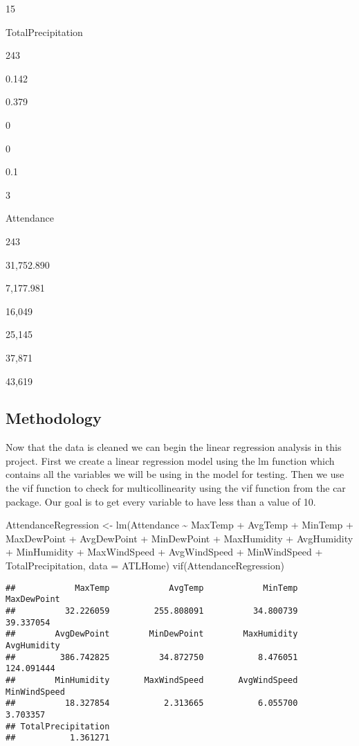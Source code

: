 \documentclass[
]{article}
\newenvironment{Shaded}{\begin{snugshade}}{\end{snugshade}}
\newcommand{\AttributeTok}[1]{\textcolor[rgb]{0.77,0.63,0.00}{#1}}
\newcommand{\FunctionTok}[1]{\textcolor[rgb]{0.00,0.00,0.00}{#1}}
\newcommand{\NormalTok}[1]{#1}
\newcommand{\OtherTok}[1]{\textcolor[rgb]{0.56,0.35,0.01}{#1}}
\newcommand{\SpecialCharTok}[1]{\textcolor[rgb]{0.00,0.00,0.00}{#1}}
\begin{document}
15

TotalPrecipitation

243

0.142

0.379

0

0

0.1

3

Attendance

243

31,752.890

7,177.981

16,049

25,145

37,871

43,619

\hypertarget{methodology}{%
\subsection{Methodology}\label{methodology}}

Now that the data is cleaned we can begin the linear regression analysis
in this project. First we create a linear regression model using the lm
function which contains all the variables we will be using in the model
for testing. Then we use the vif function to check for multicollinearity
using the vif function from the car package. Our goal is to get every
variable to have less than a value of 10.

\begin{Shaded}
\begin{Highlighting}[]
\NormalTok{AttendanceRegression }\OtherTok{\textless{}{-}} \FunctionTok{lm}\NormalTok{(Attendance }\SpecialCharTok{\textasciitilde{}}\NormalTok{ MaxTemp }\SpecialCharTok{+}\NormalTok{ AvgTemp }\SpecialCharTok{+}\NormalTok{ MinTemp }\SpecialCharTok{+} 
\NormalTok{MaxDewPoint }\SpecialCharTok{+}\NormalTok{ AvgDewPoint }\SpecialCharTok{+}\NormalTok{ MinDewPoint }\SpecialCharTok{+} 
\NormalTok{MaxHumidity }\SpecialCharTok{+}\NormalTok{ AvgHumidity }\SpecialCharTok{+}\NormalTok{ MinHumidity }\SpecialCharTok{+} 
\NormalTok{MaxWindSpeed }\SpecialCharTok{+}\NormalTok{ AvgWindSpeed }\SpecialCharTok{+}\NormalTok{ MinWindSpeed }\SpecialCharTok{+}\NormalTok{ TotalPrecipitation, }\AttributeTok{data =}\NormalTok{ ATLHome)}
\FunctionTok{vif}\NormalTok{(AttendanceRegression)}
\end{Highlighting}
\end{Shaded}

\begin{verbatim}
##            MaxTemp            AvgTemp            MinTemp        MaxDewPoint 
##          32.226059         255.808091          34.800739          39.337054 
##        AvgDewPoint        MinDewPoint        MaxHumidity        AvgHumidity 
##         386.742825          34.872750           8.476051         124.091444 
##        MinHumidity       MaxWindSpeed       AvgWindSpeed       MinWindSpeed 
##          18.327854           2.313665           6.055700           3.703357 
## TotalPrecipitation 
##           1.361271
\end{verbatim}
\end{document}
